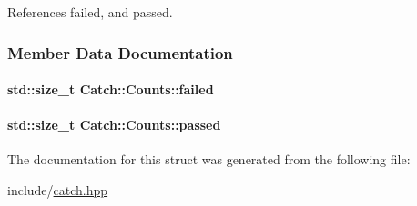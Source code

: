 References failed, and passed.



\subsubsection{Member Data Documentation}
\hypertarget{structCatch_1_1Counts_a19982a3817a3bc2c07f0290e71f497a3}{
\paragraph[{failed}]{\setlength{\rightskip}{0pt plus 5cm}std\-::size\-\_\-t Catch\-::\-Counts\-::failed}}\label{structCatch_1_1Counts_a19982a3817a3bc2c07f0290e71f497a3}
\hypertarget{structCatch_1_1Counts_ad28daaf3de28006400208b6dd0c631e6}{
\paragraph[{passed}]{\setlength{\rightskip}{0pt plus 5cm}std\-::size\-\_\-t Catch\-::\-Counts\-::passed}}\label{structCatch_1_1Counts_ad28daaf3de28006400208b6dd0c631e6}


The documentation for this struct was generated from the following file\-:\begin{DoxyCompactItemize}
\item 
include/\hyperlink{catch_8hpp}{catch.\-hpp}\end{DoxyCompactItemize}
